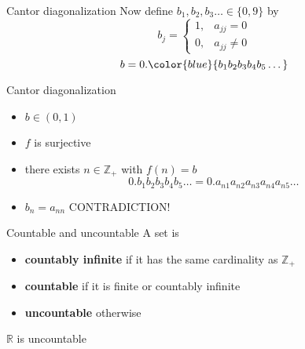 \documentclass{beamer}
\begin{document}
\begin{frame}{Cantor diagonalization}
Now define $b_1,b_2,b_3\dots\in \{0,9\}$ by
$$b_j = \left\lbrace
\begin{array}{cc}
1, & a_{jj} = 0\\
0, & a_{jj} \neq 0
\end{array}\right.$$
\pause
$$b = 0.{\color{blue}{b_1b_2b_3b_4b_5\dots}}$$
\end{frame}

\begin{frame}{Cantor diagonalization}
\begin{itemize}
\item $b\in (0,1)$
\pause
\item $f$ is surjective
\pause
\item there exists $n\in\mathbb{Z}_+$ with $f(n) = b$
\pause
$$0.b_1b_2b_3b_4b_5\dots = 0.a_{n1}a_{n2}a_{n3}a_{n4}a_{n5}\dots$$
\pause
\item $b_n = a_{nn}$ \pause CONTRADICTION!
\end{itemize}
\end{frame}

\begin{frame}{Countable and uncountable}
A set is
\begin{itemize}
\pause
\item \textbf{countably infinite} if it has the same cardinality as $\mathbb{Z}_+$
\pause
\item \textbf{countable} if it is finite or countably infinite
\pause
\item \textbf{uncountable} otherwise
\end{itemize}
\pause
\begin{thm}
$\mathbb{R}$ is uncountable
\end{thm}
\end{frame}
\end{document}

